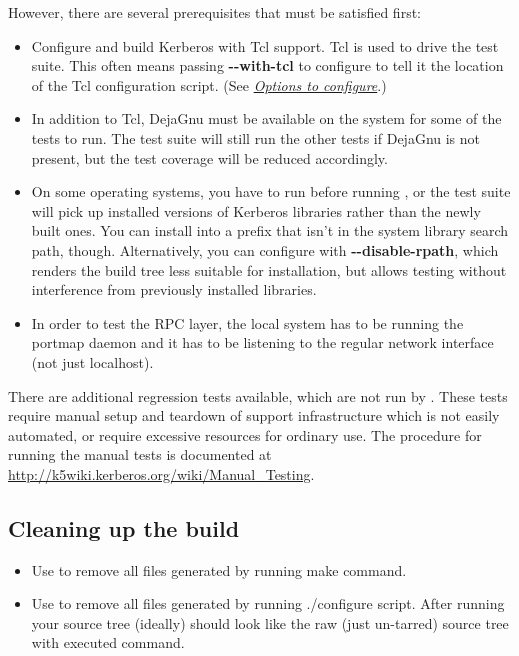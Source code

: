 \documentclass[letterpaper,10pt,english]{sphinxmanual}
\begin{document}
However, there are several prerequisites that must be satisfied first:
\begin{itemize}
\item {} 
Configure and build Kerberos with Tcl support. Tcl is used to drive
the test suite.  This often means passing \textbf{-}\textbf{-with-tcl} to
configure to tell it the location of the Tcl configuration
script. (See {\hyperref[build/options2configure:options2configure]{\emph{Options to configure}}}.)

\item {} 
In addition to Tcl, DejaGnu must be available on the system for some
of the tests to run.  The test suite will still run the other tests
if DejaGnu is not present, but the test coverage will be reduced
accordingly.

\item {} 
On some operating systems, you have to run  before
running , or the test suite will pick up installed
versions of Kerberos libraries rather than the newly built ones.
You can install into a prefix that isn't in the system library
search path, though. Alternatively, you can configure with
\textbf{-}\textbf{-disable-rpath}, which renders the build tree less suitable for
installation, but allows testing without interference from
previously installed libraries.

\item {} 
In order to test the RPC layer, the local system has to be running
the portmap daemon and it has to be listening to the regular network
interface (not just localhost).

\end{itemize}

There are additional regression tests available, which are not run
by .  These tests require manual setup and teardown of
support infrastructure which is not easily automated, or require
excessive resources for ordinary use.  The procedure for running
the manual tests is documented at
\href{http://k5wiki.kerberos.org/wiki/Manual\_Testing}{http://k5wiki.kerberos.org/wiki/Manual\_Testing}.


\subsection{Cleaning up the build}
\label{build/doing_build:cleaning-up-the-build}\begin{itemize}
\item {} 
Use  to remove all files generated by running make
command.

\item {} 
Use  to remove all files generated by running
./configure script.  After running  your source
tree (ideally) should look like the raw (just un-tarred) source tree
with executed  command.

\end{itemize}
\end{document}
